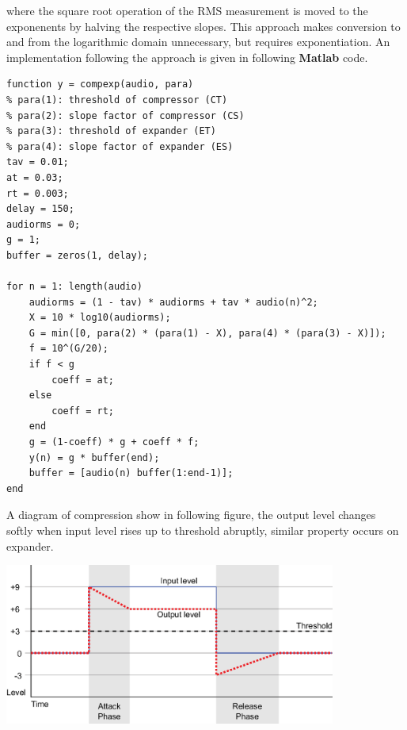 \documentclass[10pt,a4paper,oneside]{article}
\begin{document}
where the square root operation of the RMS measurement is moved to the exponenents by halving the respective slopes. This approach makes conversion to and from the logarithmic domain unnecessary, but requires exponentiation. An implementation following the approach is given in following {\bfseries Matlab} code.
\begin{lstlisting}
function y = compexp(audio, para)
% para(1): threshold of compressor (CT)
% para(2): slope factor of compressor (CS)
% para(3): threshold of expander (ET)
% para(4): slope factor of expander (ES)
tav = 0.01;
at = 0.03;
rt = 0.003;
delay = 150;
audiorms = 0;
g = 1;
buffer = zeros(1, delay);

for n = 1: length(audio)
	audiorms = (1 - tav) * audiorms + tav * audio(n)^2;
	X = 10 * log10(audiorms);
	G = min([0, para(2) * (para(1) - X), para(4) * (para(3) - X)]);
	f = 10^(G/20);
	if f < g
		coeff = at;
	else
		coeff = rt;
	end
	g = (1-coeff) * g + coeff * f;
	y(n) = g * buffer(end);
	buffer = [audio(n) buffer(1:end-1)];
end
\end{lstlisting}

A diagram of compression show in following figure, the output level changes softly when input level rises up to threshold abruptly, similar property occurs on expander. 
\begin{center}
	\includegraphics[height=150pt]{compression.eps} 
\end{center}
\end{document}
